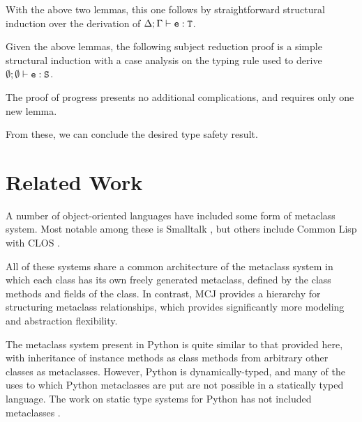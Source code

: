 \documentclass{acmconfbig}
\begin{document}
\fieldsPreservedProof

\methodTypingLemma

\methodTypingProof

\substitutionPreservesTyping
\myProof With the above two lemmas, this one follows by
straightforward structural induction over the derivation of ${\Delta;\Gamma} \vdash {\ensuremath{{\mbox {\tt e}} : {\mbox {\tt T}}}}$.

\vspace{.3cm}

Given the above lemmas, the following subject reduction proof is a
simple structural induction with a case analysis on the typing rule
used to derive ${\emptyset;\emptyset} \vdash {\ensuremath {{\mbox {\tt e}} : {\mbox {\tt S}}}}$.

\preservation

\preservationProof

The proof of progress presents no additional complications, and
requires only one new lemma.

\fieldsAgreeLemma

\progress

\progressProof

From these, we can conclude the desired type safety result.

\soundness

\soundnessProofShort


\section{Related Work}
\label{related}

A number of object-oriented languages have included some form of
metaclass system. Most notable among these is Smalltalk
\cite{Smalltalk80}, but others include Common Lisp with CLOS
\cite{ArtMOP}.

All of these systems share a common architecture of the metaclass system
in which each class has its own freely generated metaclass, defined by
the class methods and fields of the class.  In contrast, MCJ
provides a hierarchy for structuring metaclass relationships, which
provides significantly more modeling and abstraction flexibility.

The metaclass system present in Python \cite{PythonMeta} is quite
similar to that provided here, with inheritance of instance methods as
class methods from arbitrary other classes as metaclasses.  However,
Python is dynamically-typed, and many of the uses to which Python
metaclasses are put are not possible in a statically typed language.
The work on static type systems for Python has not included
metaclasses \cite{Starkiller}.
\end{document}
